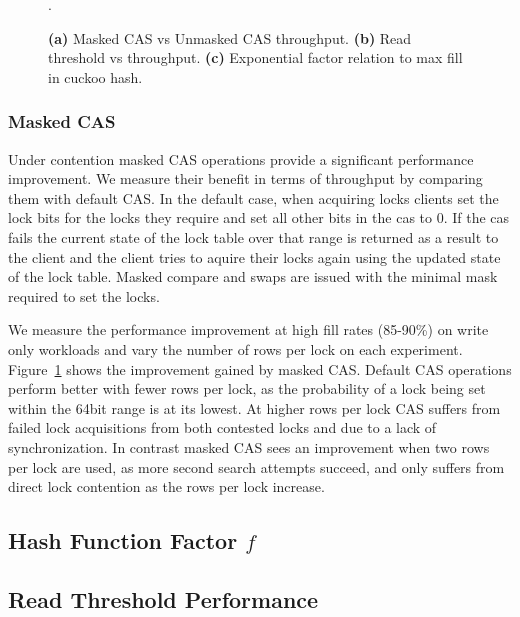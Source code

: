 \begin{figure}[t]
\begin{subfigure}{0.3\linewidth}
    \end{subfigure}.
    \vspace{-1em}
    \caption{
    \textbf{(a)} Masked CAS vs Unmasked CAS throughput.
    \textbf{(b)} Read threshold vs throughput.
    \textbf{(c)} Exponential factor relation to max fill in cuckoo hash.
    }
    \label{fig:performance_breakdown}

\end{figure}

\subsubsection{Masked CAS}

Under contention masked CAS operations provide a significant
performance improvement. We measure their benefit in terms
of throughput by comparing them with default CAS. In the
default case, when acquiring locks clients set the lock bits
for the locks they require and set all other bits in the cas
to 0. If the cas fails the current state of the lock table
over that range is returned as a result to the client and
the client tries to aquire their locks again using the
updated state of the lock table. Masked compare and swaps
are issued with the minimal mask required to set the locks.

We measure the performance improvement at high fill rates
(85-90\%) on write only workloads and vary the number of
rows per lock on each experiment.
Figure~\ref{fig:performance_breakdown} shows the improvement
gained by masked CAS. Default CAS operations perform better
with fewer rows per lock, as the probability of a lock being
set within the 64bit range is at its lowest. At higher rows
per lock CAS suffers from failed lock acquisitions from both
contested locks and due to a lack of synchronization. In
contrast masked CAS sees an improvement when two rows per
lock are used, as more second search attempts succeed, and
only suffers from direct lock contention as the rows per
lock increase.


\subsection{Hash Function Factor $f$}


\subsection{Read Threshold Performance}



